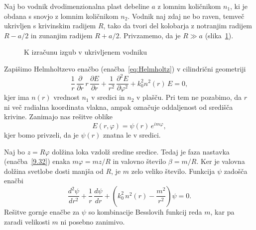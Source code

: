Naj bo vodnik dvodimenzionalna plast debeline $a$ z lomnim količnikom
$n_{1}$, ki je obdana s snovjo z lomnim količnikom $n_{2}$. Vodnik naj
zdaj ne bo raven, temveč ukrivljen s krivinskim radijem $R$, tako da tvori 
del kolobarja z notranjim radijem $R-a/2$ in zunanjim radijem $R+a/2$.
Privzamemo, da je $R\gg a$ (slika~\ref{fig:bend}). 
\begin{figure}[h]
\centering
\def\svgwidth{50truemm} 
 
\caption{K izračunu izgub v ukrivljenem vodniku}
\label{fig:bend}
\end{figure}

Zapišimo Helmholtzevo enačbo (enačba~\ref{eq:Helmholtz}) v cilindrični 
geometriji
\begin{equation}
\frac{1}{r}\,\frac{\partial}{\partial r}\, r\,\frac{\partial E}{\partial r}
+\frac{1}{r^{2}}\,\frac{\partial^{2}E}{\partial\varphi^{2}}+k_{0}^{2}n^{2}\left(r\right)\, E=0,
\label{9.31}
\end{equation}
kjer ima $n\left(r\right)$ vrednost $n_{1}$ v sredici in $n_{2}$ v plašču. 
Pri tem ne pozabimo, da $r$ ni več radialna koordinata vlakna, ampak
označuje oddaljenost od središča krivine. Zanimajo nas rešitve oblike 
\begin{equation}
E(r, \varphi) =\psi\left(r\right)\, e^{im\varphi},
\label{9.32}
\end{equation}
kjer bomo privzeli, da je $\psi\left(r\right)$ znatna le v sredici. 

Naj bo $z=R\varphi$ dolžina loka vzdolž sredine sredice. Tedaj je faza nastavka
(enačba~\ref{9.32}) enaka $m\varphi = m z/R$ in valovno število $\beta = m/R$.
Ker je valovna dolžina svetlobe dosti manjša od $R$, je $m$ zelo veliko število. 
Funkcija $\psi$ zadošča enačbi 
\begin{equation}
\frac{d^{2}\psi}{dr^{2}}+\frac{1}{r}\,\frac{d\psi}{dr}+\left(k_{0}^{2}\, 
n^{2}\left(r\right)-\frac{m^{2}}{r^{2}}\right)\psi=0.
\label{9.33}
\end{equation}
Rešitve gornje enačbe za $\psi$ so kombinacije Besslovih funkcij reda $m$, kar
pa zaradi velikosti $m$ ni posebno zanimivo. 

